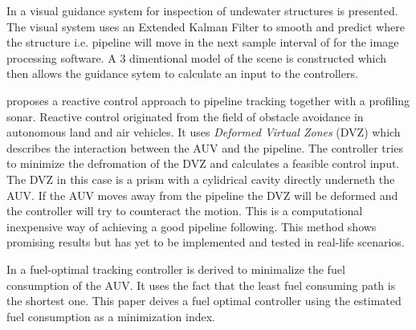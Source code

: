 	In \cite{Visual_inpsection_of_seabottom_by_AUV} a visual guidance system for inspection of undewater structures 
	is presented. The visual system uses an Extended Kalman Filter to smooth and predict where the structure i.e. 
	pipeline will move in the next sample interval of for the image processing software. A 3 dimentional model 
	of the scene is constructed which then allows the guidance sytem to calculate an input to the controllers.
	
	\cite{reactive_control_AUV} proposes a reactive control approach to pipeline tracking together with a 
	profiling sonar. Reactive control originated from the field of obstacle avoidance in autonomous land and air 
	vehicles. It uses \textit{Deformed Virtual Zones} (DVZ) which describes the interaction between the AUV and 
	the pipeline. The controller tries to minimize the defromation of the DVZ and calculates a feasible control input. 
	The DVZ in this case is a prism with a cylidrical cavity directly underneth the AUV. If the AUV moves away from 
	the pipeline the DVZ will be deformed and the controller will try to counteract the motion. This is a 
	computational inexpensive way of achieving a good pipeline following. This method shows promising results 
	but has yet to be implemented and tested in real-life scenarios. 
	
	In \cite{fuel_optimal_control} a fuel-optimal tracking controller is derived to minimalize the fuel consumption 
	of the AUV. It uses the fact that the least fuel consuming path is the shortest one. This
	paper deives a fuel optimal controller using the estimated fuel consumption as a minimization index. 


